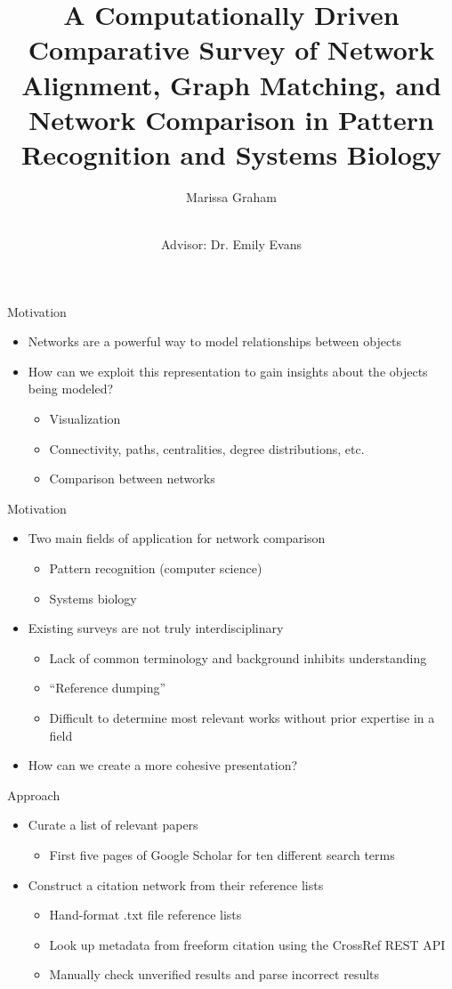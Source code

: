 \documentclass[xcolor=dvipsnames, 14pt]{beamer}
\title[]{A Computationally Driven Comparative Survey of Network Alignment, Graph Matching, and Network Comparison in Pattern Recognition and Systems Biology}
\author[M. Graham]{Marissa Graham \and \\Advisor: Dr. Emily Evans}
\institute{Brigham Young University}
\date{}
\begin{document}
\frame{\titlepage}

\begin{frame}{Motivation}
\begin{itemize}
\item Networks are a powerful way to model relationships between objects
\pause
\item How can we exploit this representation to gain insights about the objects being modeled?
\pause
\begin{itemize}
\item Visualization
\item Connectivity, paths, centralities, degree distributions, etc.
\item Comparison between networks
\end{itemize}
\end{itemize}
\end{frame}

\begin{frame}{Motivation}
\begin{itemize}
\item Two main fields of application for network comparison
\pause
\begin{itemize}
\item Pattern recognition (computer science)
\item Systems biology
\pause
\end{itemize}
\item Existing surveys are not truly interdisciplinary
\pause
\begin{itemize}
\item Lack of common terminology and background inhibits understanding
\item ``Reference dumping''
\item Difficult to determine most relevant works without prior expertise in a field
\pause
\end{itemize}
\item How can we create a more cohesive presentation?
\end{itemize}
\end{frame}

\begin{frame}{Approach}
\begin{itemize}
\item Curate a list of relevant papers
\begin{itemize}
\item First five pages of Google Scholar for ten different search terms
\pause
\end{itemize}
\item Construct a citation network from their reference lists
\pause
\begin{itemize}
\item Hand-format .txt file reference lists 
\item Look up metadata from freeform citation using the CrossRef REST API
\item Manually check unverified results and parse incorrect results
\end{itemize}
\end{itemize}
\end{frame}
\end{document}

